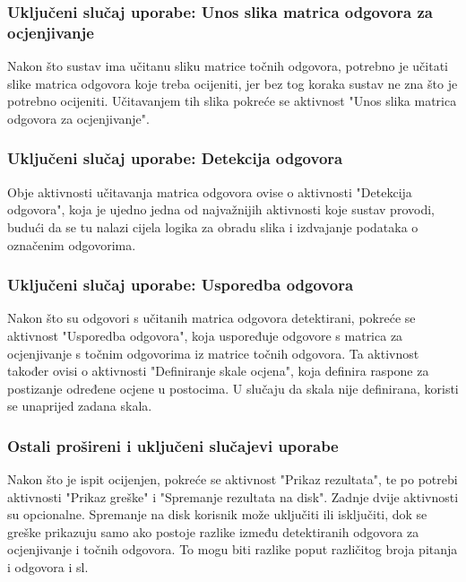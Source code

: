 \documentclass{foi}
\begin{document}
\subsubsection{Uključeni slučaj uporabe: Unos slika matrica odgovora za ocjenjivanje}
Nakon što sustav ima učitanu sliku matrice točnih odgovora, potrebno je učitati slike matrica odgovora koje treba ocijeniti, jer bez tog koraka sustav ne zna što je potrebno ocijeniti. Učitavanjem tih slika pokreće se aktivnost "Unos slika matrica odgovora za ocjenjivanje".

\subsubsection{Uključeni slučaj uporabe: Detekcija odgovora}
Obje aktivnosti učitavanja matrica odgovora ovise o aktivnosti "Detekcija odgovora", koja je ujedno jedna od najvažnijih aktivnosti koje sustav provodi, budući da se tu nalazi cijela logika za obradu slika i izdvajanje podataka o označenim odgovorima.

\subsubsection{Uključeni slučaj uporabe: Usporedba odgovora}
Nakon što su odgovori s učitanih matrica odgovora detektirani, pokreće se aktivnost "Usporedba odgovora", koja uspoređuje odgovore s matrica za ocjenjivanje s točnim odgovorima iz matrice točnih odgovora. Ta aktivnost također ovisi o aktivnosti "Definiranje skale ocjena", koja definira raspone za postizanje određene ocjene u postocima. U slučaju da skala nije definirana, koristi se unaprijed zadana skala.

\subsubsection{Ostali prošireni i uključeni slučajevi uporabe}
Nakon što je ispit ocijenjen, pokreće se aktivnost "Prikaz rezultata", te po potrebi aktivnosti "Prikaz greške" i "Spremanje rezultata na disk". Zadnje dvije aktivnosti su opcionalne. Spremanje na disk korisnik može uključiti ili isključiti, dok se greške prikazuju samo ako postoje razlike između detektiranih odgovora za ocjenjivanje i točnih odgovora. To mogu biti razlike poput različitog broja pitanja i odgovora i sl.
\end{document}
